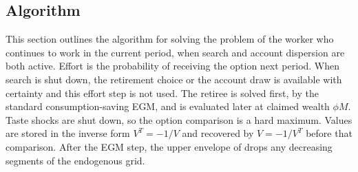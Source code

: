 \subsection{Algorithm}
This section outlines the algorithm for solving the problem of the worker who continues
to work in the current period, when search and account dispersion are both active.
Effort is the probability of receiving the option next period. When search is shut down,
the retirement choice or the account draw is available with certainty and this effort
step is not used. The retiree is solved first, by the standard consumption-saving
EGM, and is evaluated later at claimed wealth $\phi M$. Taste shocks are shut down, so the
option comparison is a hard maximum. Values are stored in the inverse form
$V^{T} = -1/V$ and recovered by $V = -1/V^{T}$ before that comparison.
After the EGM step, the upper envelope of \citet{Iskhakov2017-jb} drops any decreasing
segments of the endogenous grid.

